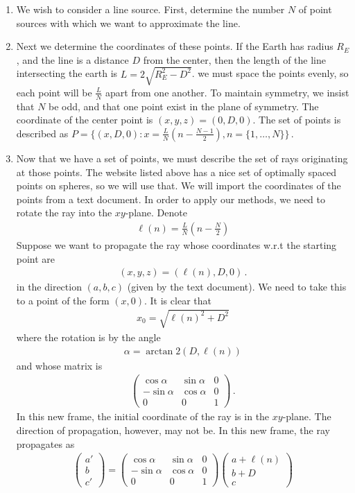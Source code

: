 \documentclass{article}
\newcommand*\p[1]{\left(#1\right)}
\newcommand*\f[2]{\frac{#1}{#2}}
\newcommand*\mat[2]{\left(\begin{array}{#1}#2\end{array}\right)}
\begin{document}
\begin{enumerate}
\item We wish to consider a line source. First, determine the number $N$ of point sources with which we want to approximate the line.
\item Next we determine the coordinates of these points. If the Earth has radius $R_E$, and the line is a distance $D$ from the center, then the length of the line intersecting the earth is $L=2\sqrt{R_E^2-D^2}$. we must space the points evenly, so each point will be $\f{L}{N}$ apart from one another. To maintain symmetry, we insist that $N$ be odd, and that one point exist in the plane of symmetry. The coordinate of the center point is $(x,y,z)=(0,D,0)$. The set of points is described as $P=\{(x,D,0):x=\f{L}{N}(n-\f{N-1}{2}),n=\{1,\dots,N\}\}$\,.
\item Now that we have a set of points, we must describe the set of rays originating at those points. The website listed above has a nice set of optimally spaced points on spheres, so we will use that. We will import the coordinates of the points from a text document. In order to apply our methods, we need to rotate the ray into the $xy$-plane. Denote
\begin{align}
\ell(n)=\f{L}{N}\p{n-\f{N}{2}}
\end{align}
Suppose we want to propagate the ray whose coordinates w.r.t the starting point are
\begin{align}
(x,y,z)=\p{\ell(n),D,0}\,.
\end{align}
in the direction $(a,b,c)$ (given by the text document). We need to take this to a point of the form $(x,0)$. It is clear that
\begin{align}
x_0=\sqrt{\ell(n)^2+D^2}
\end{align}
where the rotation is by the angle
\begin{align}
\alpha=\arctan2\p{D,\ell(n)}
\end{align}
and whose matrix is
\begin{align}
\mat{ccc}{\cos\alpha&\sin\alpha&0\\-\sin\alpha&\cos\alpha&0\\0&0&1}\,.
\end{align}
In this new frame, the initial coordinate of the ray is in the $xy$-plane. The direction of propagation, however, may not be. In this new frame, the ray propagates as
\begin{align}
\mat{c}{a'\\b\\c'}=\mat{ccc}{\cos\alpha&\sin\alpha&0\\-\sin\alpha&\cos\alpha&0\\0&0&1}\mat{c}{a+\ell(n)\\b+D\\c}

\end{align}
\end{enumerate}
\end{document}
